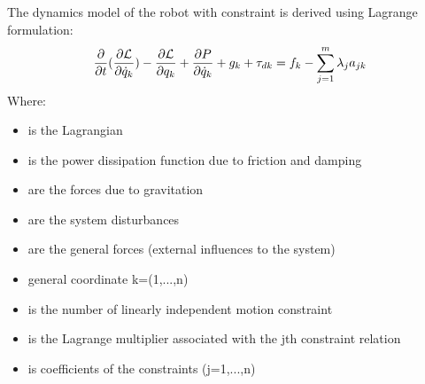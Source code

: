 The dynamics model of the robot with constraint is derived using Lagrange formulation:
\begin{equation}{\label{eq:lagrangain eq full}}
\frac{\partial}{\partial t}(\frac{\partial \mathcal{L}}{\partial \Dot{q}_k})- \frac{\partial \mathcal{L}}{\partial q_k} + \frac{\partial P}{\partial \Dot{q}_k} + g_k + \tau_{dk}= f_k - \sum_{j=1}^{m}\lambda_j a_{jk}
\end{equation}
Where:
\begin{itemize}
	\item { is the Lagrangian}
	\item { is the power dissipation function due to friction and damping}
	\item { are the forces due to gravitation}
	\item { are the system disturbances}
	\item { are the general forces (external influences to the system)}
	\item { general coordinate k=(1,...,n)}
	\item { is the number of linearly independent motion constraint}
	\item { is the Lagrange multiplier associated with the jth constraint relation}
	\item { is coefficients of the constraints (j=1,...,n)}
	
\end{itemize}

